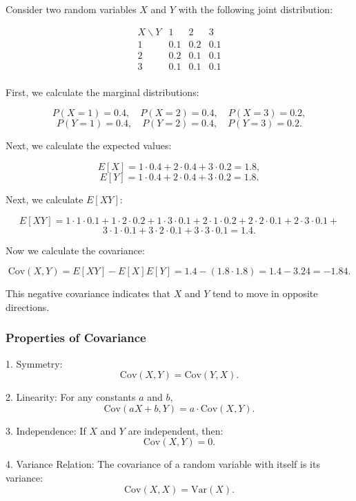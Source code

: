 \begin{example}
    Consider two random variables \(X\) and \(Y\) with the following joint distribution:

\[
\begin{array}{c|cccc}
X \backslash Y & 1 & 2 & 3 \\
\hline
1 & 0.1 & 0.2 & 0.1 \\
2 & 0.2 & 0.1 & 0.1 \\
3 & 0.1 & 0.1 & 0.1 \\
\end{array}
\]

First, we calculate the marginal distributions:

\[
P(X = 1) = 0.4, \quad P(X = 2) = 0.4, \quad P(X = 3) = 0.2,
\]
\[
P(Y = 1) = 0.4, \quad P(Y = 2) = 0.4, \quad P(Y = 3) = 0.2.
\]

Next, we calculate the expected values:

\[
E[X] = 1 \cdot 0.4 + 2 \cdot 0.4 + 3 \cdot 0.2 = 1.8,
\]
\[
E[Y] = 1 \cdot 0.4 + 2 \cdot 0.4 + 3 \cdot 0.2 = 1.8.
\]

Next, we calculate \(E[XY]\):

\[
E[XY] = 1\cdot1 \cdot 0.1 + 1\cdot2 \cdot 0.2 + 1\cdot3 \cdot 0.1 + 2\cdot1 \cdot 0.2 + 2\cdot2 \cdot 0.1 + 2\cdot3 \cdot 0.1 + 
\]
\[
    3\cdot1 \cdot 0.1 + 3\cdot2 \cdot 0.1 + 3\cdot3 \cdot 0.1 = 1.4.
\]

Now we calculate the covariance:

\[
\text{Cov}(X, Y) = E[XY] - E[X]E[Y] = 1.4 - (1.8 \cdot 1.8) = 1.4 - 3.24 = -1.84.
\]

This negative covariance indicates that \(X\) and \(Y\) tend to move in opposite directions.
\end{example}

\subsubsection{Properties of Covariance}

1. Symmetry: 
   \[
   \text{Cov}(X, Y) = \text{Cov}(Y, X).
   \]

2. Linearity: For any constants \(a\) and \(b\),
   \[
   \text{Cov}(aX + b, Y) = a \cdot \text{Cov}(X, Y).
   \]

3. Independence: If \(X\) and \(Y\) are independent, then:
   \[
   \text{Cov}(X, Y) = 0.
   \]

4. Variance Relation: The covariance of a random variable with itself is its variance:
   \[
   \text{Cov}(X, X) = \text{Var}(X).
   \]

